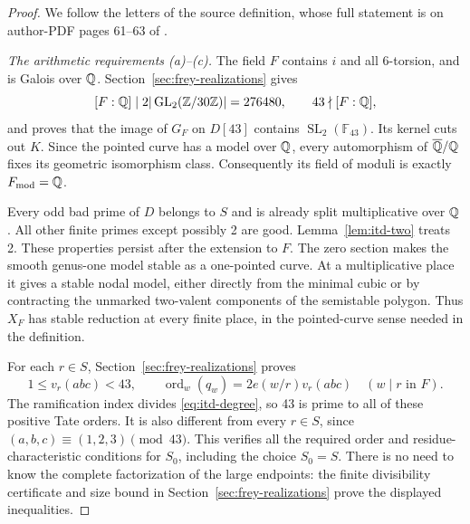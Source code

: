 \begin{proof}
We follow the letters of the source definition, whose full statement
is on author-PDF pages 61--63 of \cite{IUT1}.

\smallskip\noindent
\emph{The arithmetic requirements (a)--(c).}
The field $F$ contains $i$ and all $6$-torsion, and is Galois over
$\mathbb Q$. Section~\ref{sec:frey-realizations} gives
\begin{equation}\label{eq:itd-degree}
 [F:\mathbb Q]\mid
 2|\operatorname{GL}_2(\mathbb Z/30\mathbb Z)|=276480,
 \qquad 43\nmid[F:\mathbb Q],
\end{equation}
and proves that the image of $G_F$ on $D[43]$ contains
$\operatorname{SL}_2(\mathbb F_{43})$. Its kernel cuts out $K$.
Since the pointed curve has a model over $\mathbb Q$, every automorphism
of $\overline{\mathbb Q}/\mathbb Q$ fixes its geometric isomorphism class.
Consequently its field of moduli is exactly $F_{\rm mod}=\mathbb Q$.

Every odd bad prime of $D$ belongs to $S$ and is already split
multiplicative over $\mathbb Q$. All other finite primes except possibly
2 are good. Lemma~\ref{lem:itd-two} treats 2. These properties
persist after the extension to $F$. The zero section makes the
smooth genus-one model stable as a one-pointed curve. At a
multiplicative place it gives a stable nodal model, either directly
from the minimal cubic or by contracting the unmarked two-valent
components of the semistable polygon. Thus $X_F$ has stable
reduction at every finite place, in the pointed-curve sense needed
in the definition.

For each $r\in S$, Section~\ref{sec:frey-realizations} proves
\[
 1\le v_r(abc)<43,
 \qquad \operatorname{ord}_w(q_w)=2e(w/r)v_r(abc)
       \quad(w\mid r\text{ in }F).
\]
The ramification index divides \eqref{eq:itd-degree}, so 43 is
prime to all of these positive Tate orders. It is also different
from every $r\in S$, since $(a,b,c)\equiv(1,2,3)\pmod{43}$.
This verifies all the required order and residue-characteristic
conditions for $S_0$, including the choice $S_0=S$. There is no
need to know the complete factorization of the large endpoints:
the finite divisibility certificate and size bound in
Section~\ref{sec:frey-realizations} prove the displayed inequalities.


\end{proof}
